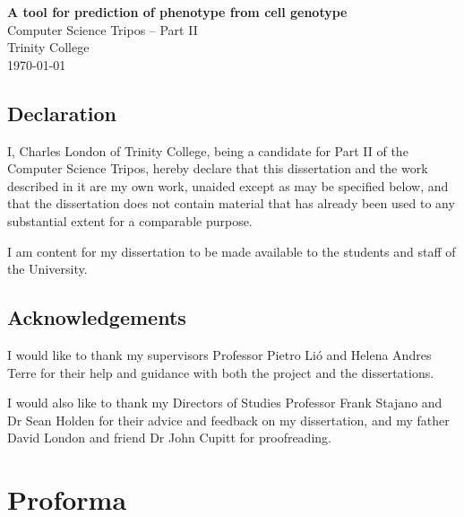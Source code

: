 \documentclass[12pt,a4paper,twoside,openany]{report}
\begin{document}

\pagestyle{empty}


\vspace*{60mm}
\begin{center}
\Huge
\textbf{A tool for prediction of phenotype from cell genotype} \\[5mm]
Computer Science Tripos -- Part II \\[5mm]
Trinity College \\[5mm]
\today  %
\end{center}


\pagestyle{plain}
 
\newpage
\section*{Declaration}

I, Charles London of Trinity College, being a candidate for Part II of the Computer
Science Tripos, hereby declare
that this dissertation and the work described in it are my own work,
unaided except as may be specified below, and that the dissertation
does not contain material that has already been used to any substantial
extent for a comparable purpose. 

I am content for my dissertation to be made available to the students and staff of the University.

\bigskip
{}

\medskip
{}

\section*{Acknowledgements}

I would like to thank my supervisors Professor Pietro Li\'o and Helena Andres Terre for their help and guidance with both the project and the dissertations.

I would also like to thank my Directors of Studies Professor Frank Stajano and Dr Sean Holden for their advice and feedback on my dissertation,
and my father David London and friend Dr John Cupitt for proofreading. 

\chapter*{Proforma}
\end{document}
